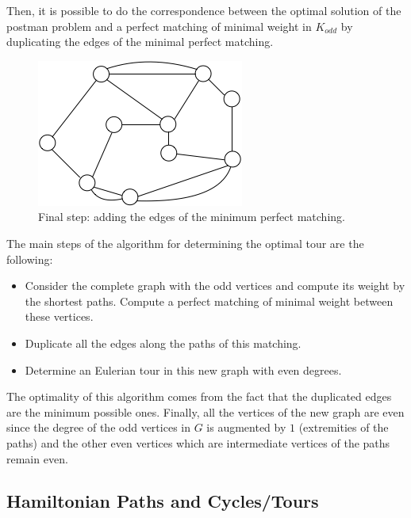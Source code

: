 Then, it is possible to do the correspondence between the optimal solution of the postman problem and a perfect matching of minimal weight in $K_{odd}$
by duplicating the edges of the minimal perfect matching.

\begin{figure}[hbt]
\begin{center}
       \includegraphics[scale=0.6]{FiguresGraph/EulerienFinal}
       \caption{Final step: adding the edges of the minimum perfect matching.}
              \label{fig:EulerianFinal}
\end{center}
\end{figure}

The main steps of the algorithm for determining the optimal tour are the following:

\begin{itemize}
\item Consider the complete graph with the odd vertices and compute its weight by the shortest paths.
Compute a perfect matching of minimal weight between these vertices. 
\item Duplicate all the edges along the paths of this matching.
\item Determine an Eulerian tour in this new graph with even degrees.
\end{itemize}

The optimality of this algorithm comes from the fact that the duplicated edges are the minimum possible ones.
Finally, all the vertices of the new graph are even since the degree of the odd vertices in $G$ is augmented by $1$
(extremities of the paths) and the other even vertices which are intermediate vertices of the paths remain even. 



\subsection{Hamiltonian Paths and Cycles/Tours}
\label{sec:Hamiltonian-cycle}

